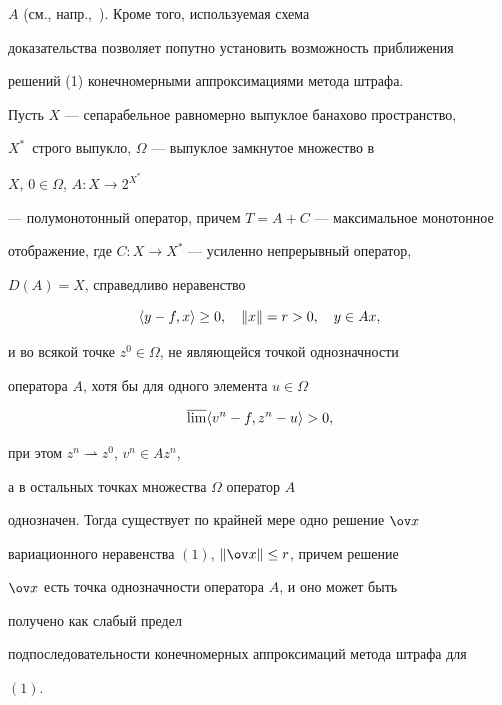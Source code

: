 $A$ (см., напр.,~\cite{8}). Кроме того, используемая схема 


доказательства позволяет попутно установить возможность приближения 


решений (1) конечномерными аппроксимациями метода штрафа. 


 


\begin{thmnonum} 


Пусть $X$ --- сепарабельное равномерно выпуклое банахово пространство, 


$X^*$~строго выпукло, $\Omega$ --- выпуклое замкнутое множество в 


$X$, $0\in\Omega$, $A:X\to 2^{X^*}$ 


--- полумонотонный оператор, причем $T=A+C$ --- максимальное монотонное 


отображение, где $C:X\to X^*$ --- усиленно непрерывный оператор, 


$D(A)=X$, справедливо неравенство 


\begin{equation} 


\la y-f,x\ra\ge 0,\quad \|x\|=r>0,\quad y\in Ax, 


\end{equation} 


и во всякой точке $z^0\in\Omega$, не являющейся точкой однозначности


оператора $A$, хотя бы для одного элемента $u\in\Omega$ 


\begin{equation} 


\varlimsup\la v^n-f,z^n-u\ra>0, 


\end{equation} 


при этом $z^n\rightharpoonup z^0$, $v^n\in A z^n$, 


а в остальных точках множества $\Omega$ оператор $A$ 


однозначен. Тогда существует по крайней мере одно решение $\ov x$ 


вариационного неравенства $(1)$, $\|\ov x\|\le r$, причем решение 


$\ov x$ есть точка однозначности оператора $A$, и оно может быть 


получено как слабый предел 


подпоследовательности конечномерных аппроксимаций метода штрафа для 


$(1)$. 


\end{thmnonum} 


